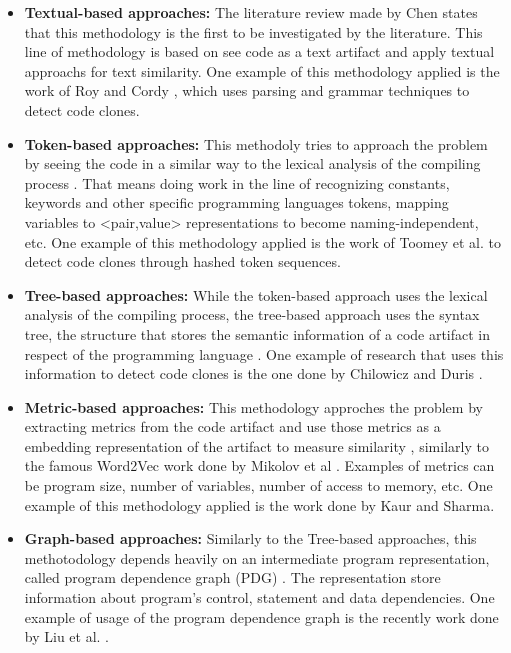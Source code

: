 \begin{itemize}
	\item \textbf{Textual-based approaches:} The literature review made by Chen \citep{litreview}  states that this methodology
	is the first to be investigated by the literature. This line of methodology is based on see code as a text artifact and apply
	textual approachs for text similarity. One example of this methodology applied is the work of Roy and Cordy \citep{textexample}, 
	which uses parsing and grammar techniques to detect code clones.

	\item \textbf{Token-based approaches:} This methodoly tries to approach the problem by seeing the code in a similar way to
	the lexical analysis of the compiling process \citep{litreview} . That means doing work in the line of recognizing constants, keywords and other 
	specific programming languages tokens, mapping variables to <pair,value> representations to become naming-independent, etc. One example of 
	this methodology applied  is the work of Toomey et al. \citep{tokenexample} to detect code clones through hashed token sequences.

	\item \textbf{Tree-based approaches:} While the token-based approach uses the lexical analysis of the compiling process, the 
	tree-based approach uses the syntax tree, the structure that  stores the semantic information of a code artifact in respect of the 
	programming language \citep{compiler}. One example of research that uses this information to detect code clones is the one done by
	Chilowicz and Duris \citep{treeexample}.

	\item \textbf{Metric-based approaches:} This methodology approches the problem by extracting metrics from the code artifact and use 
	those metrics as a embedding representation of the artifact to measure similarity \citep{litreview}, similarly to the famous  
	Word2Vec work done by Mikolov et al \citep{wordtovec}. Examples of metrics can be program size, number of variables, number of 
	access to memory, etc. One example of this methodology applied is the work done by Kaur and Sharma. \citep{metricexample}

	\item \textbf{Graph-based approaches:} Similarly to the Tree-based approaches, this methotodology depends heavily on an intermediate
	program representation, called program dependence graph (PDG) \citep{prodg}. The representation store information 
	about program's control, statement and data dependencies. One example of usage of the program dependence graph is 
	the recently work done by Liu et al. \citep{tailor}.
\end{itemize}


